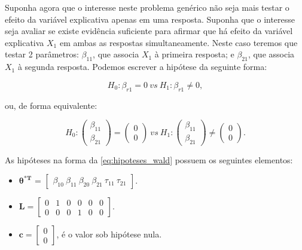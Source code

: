 \documentclass[AMA,STIX1COL]{WileyNJD-v2}
\begin{document}
Suponha agora que o interesse neste problema genérico não seja mais testar o efeito da variável explicativa apenas em uma resposta. Suponha que o interesse seja avaliar se existe evidência suficiente para afirmar que há efeito da variável explicativa $X_1$ em ambas as respostas simultaneamente. Neste caso teremos que testar 2 parâmetros: $\beta_{11}$, que associa $X_1$ à primeira resposta; e $\beta_{21}$, que associa $X_1$ à segunda resposta. Podemos escrever a hipótese da seguinte forma:

\begin{equation}
\label{eq:ex2}
H_0: \beta_{r1} = 0 \ vs \ H_1: \beta_{r1} \neq 0,
\end{equation}

\noindent ou, de forma equivalente:

$$
H_0: 
\begin{pmatrix}
\beta_{11} \\ 
\beta_{21}
\end{pmatrix} 
= 
\begin{pmatrix}
0 \\ 
0
\end{pmatrix}
\ vs \ 
H_1: 
\begin{pmatrix}
\beta_{11} \\ 
\beta_{21}
\end{pmatrix} 
\neq
\begin{pmatrix}
0 \\ 
0 
\end{pmatrix}.
$$

As hipóteses na forma da \autoref{eq:hipoteses_wald} possuem os seguintes elementos:

\begin{itemize}
  
  \item $\boldsymbol{\theta^{*T}}$ = $\begin{bmatrix} \beta_{10} \  \beta_{11} \ \beta_{20} \ \beta_{21} \ \tau_{11} \ \tau_{21} \end{bmatrix}$.


\item $\boldsymbol{L} = \begin{bmatrix} 0 & 1 & 0 & 0 & 0 & 0 \\
0 & 0 & 0 & 1 & 0 & 0 \end{bmatrix}.$
 
\item $\boldsymbol{c} = \begin{bmatrix} 0 \\ 0 \end{bmatrix}$, é o valor sob hipótese nula. 

\end{itemize}
\end{document}
